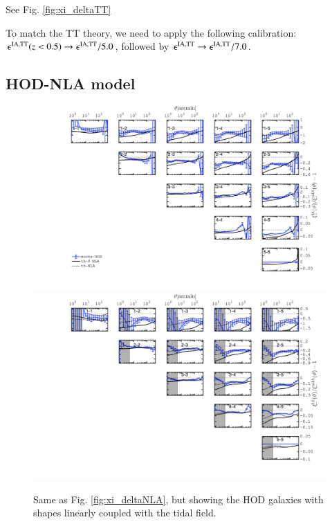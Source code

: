 \documentclass[useAMS,usenatbib]{mn2e}
\begin{document}
See Fig. \ref{fig:xi_deltaTT}

To match the TT theory, we need to apply the following calibration: $\epsilon^{\rm IA, TT}(z<0.5) \rightarrow \epsilon^{\rm IA, TT} /5.0$, followed by $\epsilon^{\rm IA, TT} \rightarrow \epsilon^{\rm IA, TT}/7.0$.

\subsection{HOD-NLA model}
\label{subsec:HOD}


\begin{figure}
\includegraphics[width=\columnwidth]{graphs/frac_xip_sims_HOD.jpg}
\includegraphics[width=\columnwidth]{graphs/frac_xim_sims_HOD.jpg}
\caption{Same as Fig. \ref{fig:xi_deltaNLA}, but showing the HOD galaxies with shapes linearly coupled with the tidal field. }
\label{fig:xi_HOD}
\end{figure}
\end{document}
